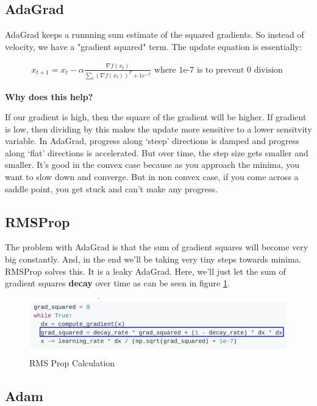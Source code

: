 \subsection{AdaGrad}

AdaGrad keeps a runnning sum estimate of the squared gradients. So instead of velocity, we have a "gradient squared" term. The update equation is essentially:

\begin{equation}
\begin{split}
    x_{t+1} = x_t - \alpha \frac{\nabla f(x_t)}{\sum_t (\nabla f(x_t))^T + 1e^{-7}} \text{ where 1e-7 is to prevent 0 division }
\end{split}
\end{equation}

\textbf{Why does this help?}

If our gradient is high, then the square of the gradient will be higher. If gradient is low, then dividing by this makes the update more sensitive to a lower sensitvity variable. In AdaGrad, progress along ‘steep’ directions is damped and progress along ‘flat’ directions is accelerated. But over time, the step size gets smaller and smaller. It’s good in the convex case because as you approach the minima, you want to slow down and converge. But in non convex case, if you come across a saddle point, you get stuck and can’t make any progress.

\subsection{RMSProp}

The problem with AdaGrad is that the sum of gradient squares will become very big constantly. And, in the end we'll be taking very tiny steps towards minima. RMSProp solves this. It is a leaky AdaGrad. Here, we'll just let the sum of gradient squares \textbf{decay} over time as can be seen in figure \ref{fig:rms+prop}.

\begin{figure}[h]
    \centering
    \includegraphics[width=12cm]{img/RMSProp.png}
    \caption{RMS Prop Calculation}
    \label{fig:rms+prop}
\end{figure}
\subsection{Adam}

